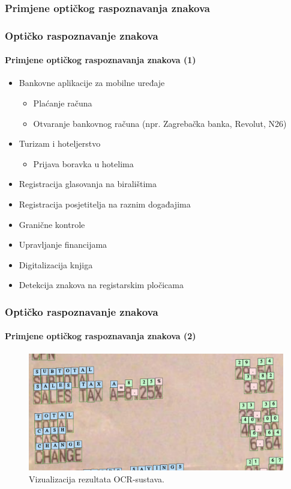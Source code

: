 \documentclass{beamer}
\begin{document}
\subsubsection{Primjene optičkog raspoznavanja znakova}
\begin{frame}
\frametitle{Optičko raspoznavanje znakova}
\framesubtitle{Primjene optičkog raspoznavanja znakova (1)}
\begin{itemize}
    \item Bankovne aplikacije za mobilne uređaje
    \begin{itemize}
        \item Plaćanje računa
        \item Otvaranje bankovnog računa (npr. Zagrebačka banka, Revolut, N26)
    \end{itemize}
    \item Turizam i hoteljerstvo
    \begin{itemize}
        \item Prijava boravka u hotelima
    \end{itemize}
    \item Registracija glasovanja na biralištima
    \item Registracija posjetitelja na raznim događajima
    \item Granične kontrole
    \item Upravljanje financijama
    \item Digitalizacija knjiga
    \item Detekcija znakova na registarskim pločicama
\end{itemize}
\end{frame}

\begin{frame}
\frametitle{Optičko raspoznavanje znakova}
\framesubtitle{Primjene optičkog raspoznavanja znakova (2)}
\begin{figure}[htb]
    \centering
    \includegraphics[width=12cm]{images/receipt-example-01.png}
    \caption{Vizualizacija rezultata OCR-sustava.}
    \label{fig:ocr-result-01}
\end{figure}
\end{frame}
\end{document}
